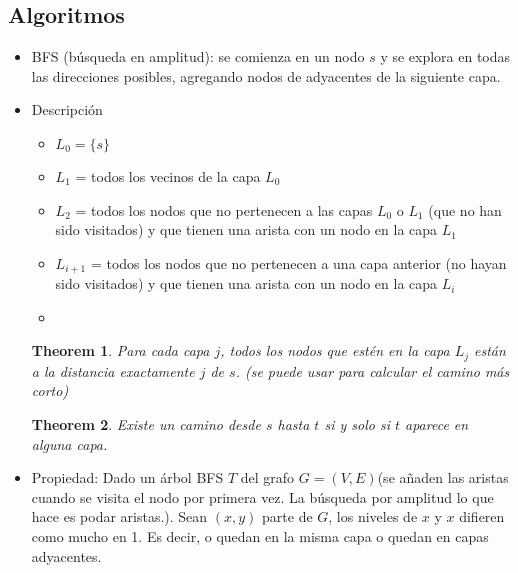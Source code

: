 \documentclass[12pt, fleqn]{article}
\newtheorem{theorem}{Theorem}[section]
\begin{document}
        \subsection{Algoritmos}
        \begin{itemize}
            \item BFS (búsqueda en amplitud): se comienza en un nodo $s$ y se explora en todas las direcciones posibles, 
                agregando nodos de adyacentes de la siguiente capa.
            \item Descripción
                \begin{itemize}
                    \item $L_0 = \{s\}$
                    \item $L_1$ = todos los vecinos de la capa $L_0$
                    \item $L_2$ = todos los nodos que no pertenecen a las capas $L_0$ o $L_1$ (que no han sido visitados) 
                        y que tienen una arista con un nodo en la capa $L_1$
                    \item $L_{i+1}$ = todos los nodos que no pertenecen a una capa anterior (no hayan sido visitados) 
                        y que tienen una arista con un nodo en la capa $L_i$
                    \item 
                \end{itemize}
                \begin{theorem}
                    Para cada capa $j$, todos los nodos que estén en la capa $L_j$ están a la distancia exactamente $j$ de $s$. 
                    (se puede usar para calcular el camino más corto)
                \end{theorem}
                \begin{theorem}
                    Existe un camino desde $s$ hasta $t$ si y solo si $t$ aparece en alguna capa.
                \end{theorem}
            \item Propiedad: Dado un árbol BFS $T$ del grafo $G = (V, E)$(se añaden las aristas cuando se visita el nodo por primera vez. 
                La búsqueda por amplitud lo que hace es podar aristas.). Sean $(x,y)$ parte de $G$, los niveles de $x$ y $x$ difieren como mucho en 1.
                Es decir, o quedan en la misma capa o quedan en capas adyacentes.
        \end{itemize}
\end{document}
